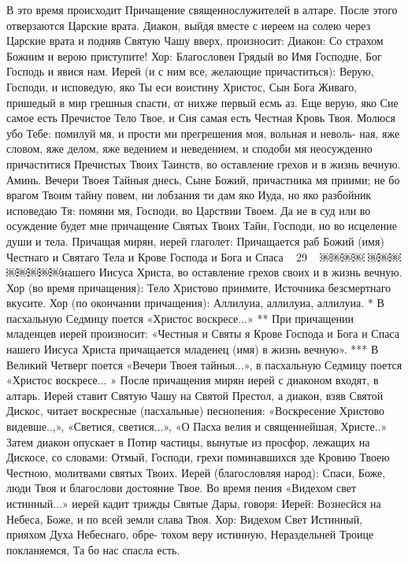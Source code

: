 В это время происходит Причащение священнослужителей в алтаре. После этого отверзаются Царские врата. Диакон, выйдя вместе с иереем на солею через Царские врата и подняв Святую Чашу вверх, произносит:
Диакон: Со страхом Божиим и верою приступите!
Хор: Благословен Грядый во Имя Господне, Бог Господь и
явися нам.
Иерей (и с ним все, желающие причаститься): Верую, Господи, и исповедую, яко Ты еси воистину Христос, Сын Бога Живаго, пришедый в мир грешныя спасти, от нихже первый есмь аз. Еще верую, яко Сие самое есть Пречистое Тело Твое, и Сия самая есть Честная Кровь Твоя. Молюся убо Тебе: помилуй мя, и прости ми прегрешения моя, вольная и неволь- ная, яже словом, яже делом, яже ведением и неведением, и сподоби мя неосужденно причаститися Пречистых Твоих Таинств, во оставление грехов и в жизнь вечную. Аминь. Вечери Твоея Тайныя днесь, Сыне Божий, причастника мя приими; не бо врагом Твоим тайну повем, ни лобзания ти дам яко Иуда, но яко разбойник исповедаю Тя: помяни мя, Господи, во Царствии Твоем.
Да не в суд или во осуждение будет мне причащение Святых Твоих Тайн, Господи, но во исцеление души и тела.
Причащая мирян, иерей глаголет: Причащается раб Божий (имя) Честнаго и Святаго Тела и Крове Господа и Бога и Спаса
~ 29 ~
￼￼￼￼
￼￼￼￼￼￼￼￼нашего Иисуса Христа, во оставление грехов своих и в жизнь вечную.
Хор (во время причащения): Тело Христово приимите, Источника безсмертнаго вкусите.
Хор (по окончании причащения): Аллилуиа, аллилуиа, аллилуиа.
* В пасхальную Седмицу поется «Христос воскресе...»
** При причащении младенцев иерей произносит: «Честныя и Святы я Крове Господа и Бога и Спаса нашего Иисуса Христа причащается младенец (имя) в жизнь вечную».
*** В Великий Четверг поется «Вечери Твоея тайныя...», в пасхальную Седмицу поется «Христос воскресе... »
После причащения мирян иерей с диаконом входят, в алтарь. Иерей ставит Святую Чашу на Святой Престол, а диакон, взяв Святой Дискос, читает воскресные (пасхальные) песнопения: «Воскресение Христово видевше..,», «Светися, светися...», «О Пасха велия и священнейшая, Христе..»
Затем диакон опускает в Потир частицы, вынутые из просфор, лежащих на Дискосе, со словами: Отмый, Господи, грехи поминавшихся зде Кровию Твоею Честною, молитвами святых Твоих.
Иерей (благословляя народ): Спаси, Боже, люди Твоя и
благослови достояние Твое.
Во время пения «Видехом свет истинный...» иерей кадит трижды Святые Дары, говоря: Иерей: Вознесйся на Небеса, Боже, и по всей земли слава Твоя.
Хор: Видехом Свет Истинный, прияхом Духа Небеснаго, обре- тохом веру истинную, Нераздельней Троице покланяемся, Та бо нас спасла есть.
